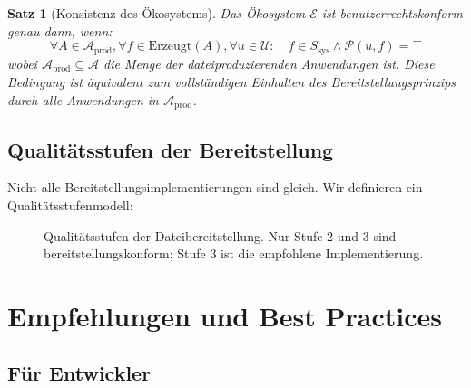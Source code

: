 ﻿\documentclass[12pt, a4paper]{article}
\newtheorem{satz}[definition]{Satz}
\begin{document}
\begin{satz}[Konsistenz des Ökosystems]
Das Ökosystem $\mathcal{E}$ ist \emph{benutzerrechtskonform} genau dann, wenn:
\[
  \forall A \in \mathcal{A}_{\text{prod}}, \forall f \in \text{Erzeugt}(A), \forall u \in \mathcal{U}:
  \quad f \in S_{\text{sys}} \wedge \mathcal{P}(u, f) = \top
\]
wobei $\mathcal{A}_{\text{prod}} \subseteq \mathcal{A}$ die Menge der dateiproduzierenden
Anwendungen ist. Diese Bedingung ist äquivalent zum vollständigen Einhalten des
Bereitstellungsprinzips durch alle Anwendungen in $\mathcal{A}_{\text{prod}}$.
\end{satz}

\subsection{Qualitätsstufen der Bereitstellung}

Nicht alle Bereitstellungsimplementierungen sind gleich. Wir definieren ein
Qualitätsstufenmodell:

\begin{figure}[ht]
\centering
{}
\caption{Qualitätsstufen der Dateibereitstellung. Nur Stufe 2 und 3 sind
bereitstellungskonform; Stufe 3 ist die empfohlene Implementierung.}
\label{fig:qualitaet}
\end{figure}

\section{Empfehlungen und Best Practices}
\label{sec:empfehlungen}

\subsection{Für Entwickler}
\end{document}
